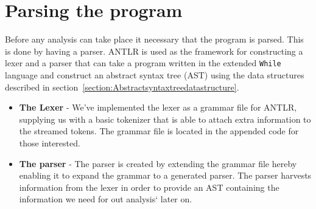 \section{Parsing the program}
Before any analysis can take place it necessary that the program is parsed. This is done by having a parser. ANTLR is used as the framework for constructing a lexer and a parser that can take a program written in the extended \texttt{While} language and construct an abstract syntax tree (AST) using the data structures described in section~\ref{section:Abstractsyntaxtreedatastructure}. 
\begin{itemize}
	\item \textbf{The Lexer} - We've implemented the lexer as a grammar file for ANTLR, supplying us with a basic tokenizer that is able to attach extra information to the streamed tokens. The grammar file is located in the appended code for those interested.
	\item \textbf{The parser} - The parser is created by extending the grammar file hereby enabling it to expand the grammar to a generated parser. The parser harvests information from the lexer in order to provide an AST containing the information we need for out analysis` later on.
\end{itemize}


